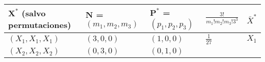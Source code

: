 \documentclass[]{book}
\theoremstyle{break}
\theoremstyle{definition}
\theoremstyle{definition}
\theoremstyle{definition}
\theoremstyle{remark}
\begin{document}
\begin{longtable}[]{@{}lllll@{}}
\toprule
\begin{minipage}[b]{0.18\columnwidth}\raggedright\strut
\(\mathbf{X}^{\ast}\) (salvo permutaciones)\strut
\end{minipage} & \begin{minipage}[b]{0.16\columnwidth}\raggedright\strut
\(\mathbf{N}\) = \(\left( m_1,m_2,m_3 \right)\)\strut
\end{minipage} & \begin{minipage}[b]{0.16\columnwidth}\raggedright\strut
\(\mathbf{P}^{\ast}\) = \(\left(p_1,p_2,p_3 \right)\)\strut
\end{minipage} & \begin{minipage}[b]{0.17\columnwidth}\raggedright\strut
\(\frac{3!}{m_1!m_2!m_3!3^{3}}\)\strut
\end{minipage} & \begin{minipage}[b]{0.18\columnwidth}\raggedright\strut
\(\bar{X}^{\ast}\)\strut
\end{minipage}\tabularnewline
\midrule
\endhead
\begin{minipage}[t]{0.18\columnwidth}\raggedright\strut
\(\left( X_1,X_1,X_1 \right)\)\strut
\end{minipage} & \begin{minipage}[t]{0.16\columnwidth}\raggedright\strut
\(\left( 3,0,0 \right)\)\strut
\end{minipage} & \begin{minipage}[t]{0.16\columnwidth}\raggedright\strut
\(\left(1,0,0 \right)\)\strut
\end{minipage} & \begin{minipage}[t]{0.17\columnwidth}\raggedright\strut
\(\frac{1}{27}\)\strut
\end{minipage} & \begin{minipage}[t]{0.18\columnwidth}\raggedright\strut
\(X_1\)\strut
\end{minipage}\tabularnewline
\begin{minipage}[t]{0.18\columnwidth}\raggedright\strut
\(\left( X_2,X_2,X_2 \right)\)\strut
\end{minipage} & \begin{minipage}[t]{0.16\columnwidth}\raggedright\strut
\(\left( 0,3,0 \right)\)\strut
\end{minipage} & \begin{minipage}[t]{0.16\columnwidth}\raggedright\strut
\(\left(0,1,0 \right)\)\strut
\end{minipage} & \begin{minipage}[t]{0.17\columnwidth}\raggedright\strut

\end{minipage}
\end{longtable}
\end{document}
